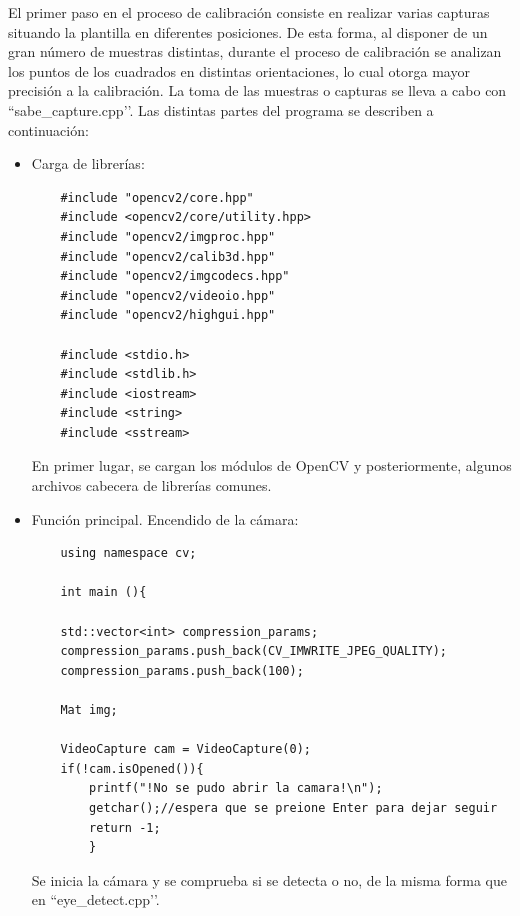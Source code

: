El primer paso en el proceso de calibración consiste en realizar varias capturas situando la plantilla en diferentes posiciones. De esta forma, al disponer de un gran número de muestras distintas, durante el proceso de calibración se analizan los puntos de los cuadrados en distintas orientaciones, lo cual otorga mayor precisión a la calibración.
La toma de las muestras o capturas se lleva a cabo con ``sabe\_capture.cpp’’. Las distintas partes del programa se describen a continuación:


\begin{itemize}
    \item Carga de librerías:\\
    
    \begin{verbatim} 
    #include "opencv2/core.hpp"
    #include <opencv2/core/utility.hpp>
    #include "opencv2/imgproc.hpp"
    #include "opencv2/calib3d.hpp"
    #include "opencv2/imgcodecs.hpp"
    #include "opencv2/videoio.hpp"
    #include "opencv2/highgui.hpp"
    
    #include <stdio.h>
    #include <stdlib.h>
    #include <iostream>
    #include <string> 
    #include <sstream> 
    \end{verbatim} 
    
    
En primer lugar, se cargan los módulos de OpenCV y posteriormente, algunos archivos cabecera de librerías comunes.
    
    \item Función principal. Encendido de la cámara:\\
    
    \begin{verbatim} 
    using namespace cv;
    
    int main (){

    std::vector<int> compression_params;
    compression_params.push_back(CV_IMWRITE_JPEG_QUALITY);
    compression_params.push_back(100);
    
    Mat img;
    
    VideoCapture cam = VideoCapture(0);
    if(!cam.isOpened()){
    	printf("!No se pudo abrir la camara!\n");
    	getchar();//espera que se preione Enter para dejar seguir
    	return -1;
    	} 
    \end{verbatim} 
    
Se inicia la cámara y se comprueba si se detecta o no, de la misma forma que en ``eye\_detect.cpp’’. 
    

\end{itemize}
